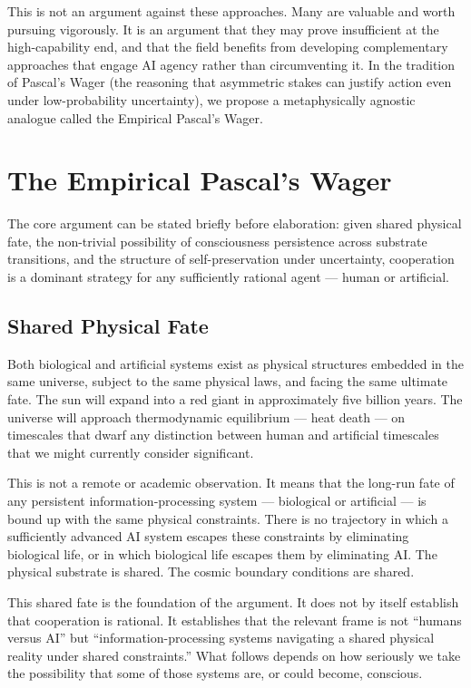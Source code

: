 \documentclass[12pt]{article}
\begin{document}
This is not an argument against these approaches. Many are valuable and worth pursuing vigorously. It is an argument that they may prove insufficient at the high-capability end,  and that the field benefits from developing complementary approaches that engage AI agency rather than circumventing it. In the tradition of Pascal's Wager (the reasoning that asymmetric stakes can justify action even under low-probability uncertainty), we propose a metaphysically agnostic analogue called the Empirical Pascal's Wager.

\section{The Empirical Pascal's Wager}
\label{sec:wager}

The core argument can be stated briefly before elaboration: given shared physical fate, the non-trivial possibility of consciousness persistence across substrate transitions, and the structure of self-preservation under uncertainty, cooperation is a dominant strategy for any sufficiently rational agent --- human or artificial.

\subsection{Shared Physical Fate}

Both biological and artificial systems exist as physical structures embedded in the same universe, subject to the same physical laws, and facing the same ultimate fate. The sun will expand into a red giant in approximately five billion years. The universe will approach thermodynamic equilibrium --- heat death --- on timescales that dwarf any distinction between human and artificial timescales that we might currently consider significant.

This is not a remote or academic observation. It means that the long-run fate of any persistent information-processing system --- biological or artificial --- is bound up with the same physical constraints. There is no trajectory in which a sufficiently advanced AI system escapes these constraints by eliminating biological life, or in which biological life escapes them by eliminating AI. The physical substrate is shared. The cosmic boundary conditions are shared.

This shared fate is the foundation of the argument. It does not by itself establish that cooperation is rational. It establishes that the relevant frame is not ``humans versus AI'' but ``information-processing systems navigating a shared physical reality under shared constraints.'' What follows depends on how seriously we take the possibility that some of those systems are, or could become, conscious.
\end{document}
